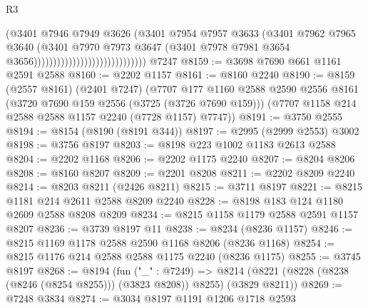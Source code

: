 \begin{lexlean}{R3}
\begin{coremodule}
                                                    (@3401
                                                      @7946
                                                      @7949
                                                      @3626
                                                      (@3401
                                                        @7954
                                                        @7957
                                                        @3633
                                                        (@3401
                                                          @7962
                                                          @7965
                                                          @3640
                                                          (@3401
                                                            @7970
                                                            @7973
                                                            @3647
                                                            (@3401
                                                              @7978
                                                              @7981
                                                              @3654
                                                              @3656)))))))))))))))))))))))))))))
    @7247
@8159 := @3698 @7690 @661 @1161 @2591 @2588
@8160 := @2202 @1157
@8161 := @8160 @2240
@8190 := @8159
    (@2557 @8161)
    (@2401 @7247)
    (@7707
      @177
      @1160
      @2588
      @2590
      @2556
      @8161
      (@3720 @7690 @159 @2556 (@3725 (@3726 @7690 @159)))
      (@7707 @1158 @214 @2588 @2588 @1157 @2240 (@7728 @1157) @7747))
@8191 := @3750 @2555
@8194 := @8154 (@8190 (@8191 @344))
@8197 := @2995 (@2999 @2553) @3002
@8198 := @3756 @8197
@8203 := @8198 @223 @1002 @1183 @2613 @2588
@8204 := @2202 @1168
@8206 := @2202 @1175 @2240
@8207 := @8204 @8206
@8208 := @8160 @8207
@8209 := @2201 @8208
@8211 := @2202 @8209 @2240
@8214 := @8203 @8211 (@2426 @8211)
@8215 := @3711 @8197
@8221 := @8215 @1181 @214 @2611 @2588 @8209 @2240
@8228 := @8198 @183 @124 @1180 @2609 @2588 @8208 @8209
@8234 := @8215 @1158 @1179 @2588 @2591 @1157 @8207
@8236 := @3739 @8197 @11
@8238 := @8234 (@8236 @1157)
@8246 := @8215 @1169 @1178 @2588 @2590 @1168 @8206 (@8236 @1168)
@8254 := @8215 @1176 @214 @2588 @2588 @1175 @2240 (@8236 @1175)
@8255 := @3745 @8197
@8268 := @8194
    (fun ("_" : @7249) =>
    @8214 (@8221 (@8228 (@8238 (@8246 (@8254 @8255))) (@3823 @8208)) @8255) (@3829 @8211))
@8269 := @7248 @3834
@8274 := @3034 @8197 @1191 @1206 @1718 @2593

\end{coremodule}
\end{lexlean}
